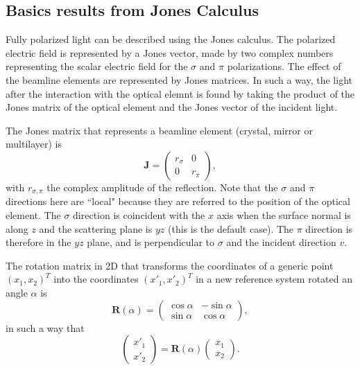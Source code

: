 \documentclass{iucr}
\begin{document}


\subsection{Basics results from Jones Calculus}
\label{sec:Jones}

Fully polarized light can be described using the Jones calculus. The polarized electric field is represented by a Jones vector, made by two complex numbers representing the scalar electric field for the $\sigma$ and $\pi$ polarizations. 
The effect of the beamline elements are represented by Jones matrices.
In such a way, the light after the interaction with the optical elemnt is found by taking the product of the Jones matrix of the optical element and the Jones vector of the incident light. 

The Jones matrix that represents a beamline element (crystal, mirror or multilayer) is
\begin{equation}\label{eq:J}
\textbf{J} = 
\begin{pmatrix}
r_\sigma & 0\\
0 & r_\pi
\end{pmatrix},
\end{equation}
with $r_{\sigma,\pi}$ the complex amplitude of the reflection.
Note that the $\sigma$ and $\pi$ directions here are ``local" because they are referred to the position of the optical element. The $\sigma$ direction is coincident with the $x$ axis when the surface normal is along $z$ and the scattering plane is $yz$ (this is the default case). The $\pi$ direction is therefore in the $yz$ plane, and is perpendicular to $\sigma$ and the incident direction $v$.

The rotation matrix in 2D that transforms the coordinates of a generic point $(x_1,x_2)^T$ into the coordinates $(x'_1,x'_2)^T$ in a new reference system rotated an angle $\alpha$ is \cite{LeClair}
\begin{equation}
\textbf{R}(\alpha) = 
\begin{pmatrix}
\cos\alpha & -\sin\alpha\\
\sin\alpha & \cos\alpha
\end{pmatrix},
\end{equation}
in such a way that
\begin{equation}
\begin{pmatrix}
x'_1 \\
x'_2
\end{pmatrix} = 
\textbf{R}(\alpha)
\begin{pmatrix}
x_1 \\
x_2
\end{pmatrix}.
\end{equation}
\end{document}
